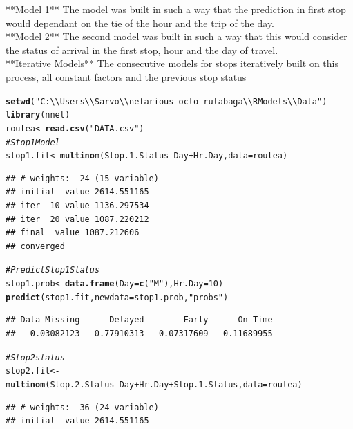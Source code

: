\documentclass[12pt]{article}\usepackage[]{graphicx}\usepackage[]{color}
\makeatletter
\newcommand{\hlnum}[1]{\textcolor[rgb]{0.686,0.059,0.569}{#1}}%
\newcommand{\hlstr}[1]{\textcolor[rgb]{0.192,0.494,0.8}{#1}}%
\newcommand{\hlcom}[1]{\textcolor[rgb]{0.678,0.584,0.686}{\textit{#1}}}%
\newcommand{\hlopt}[1]{\textcolor[rgb]{0,0,0}{#1}}%
\newcommand{\hlstd}[1]{\textcolor[rgb]{0.345,0.345,0.345}{#1}}%
\newcommand{\hlkwb}[1]{\textcolor[rgb]{0.69,0.353,0.396}{#1}}%
\newcommand{\hlkwc}[1]{\textcolor[rgb]{0.333,0.667,0.333}{#1}}%
\newcommand{\hlkwd}[1]{\textcolor[rgb]{0.737,0.353,0.396}{\textbf{#1}}}%
\newenvironment{kframe}{%
 \def\at@end@of@kframe{}%
 \ifinner\ifhmode%
  \def\at@end@of@kframe{\end{minipage}}%
  \begin{minipage}{\columnwidth}%
 \fi\fi%
 \def\FrameCommand##1{\hskip\@totalleftmargin \hskip-\fboxsep
 \colorbox{shadecolor}{##1}\hskip-\fboxsep
     \hskip-\linewidth \hskip-\@totalleftmargin \hskip\columnwidth}%
 \MakeFramed {\advance\hsize-\width
   \@totalleftmargin\z@ \linewidth\hsize
   \@setminipage}}%
 {\par\unskip\endMakeFramed%
 \at@end@of@kframe}
\newenvironment{knitrout}{}{} %
\makeatother
\begin{document}
**Model 1** The model was built in such a way that the prediction in first stop would dependant on the tie of the hour and the trip of the day.\\
**Model 2** The second model was built in such a way that this would consider the status of arrival in the first stop, hour and the day of travel.\\
**Iterative Models** The consecutive models for stops iteratively built on this process, all constant factors and the previous stop status
\begin{knitrout}
\color{fgcolor}\begin{kframe}
\begin{alltt}
\hlkwd{setwd}\hlstd{(}\hlstr{"C:\textbackslash{}\textbackslash{}Users\textbackslash{}\textbackslash{}Sarvo\textbackslash{}\textbackslash{}nefarious-octo-rutabaga\textbackslash{}\textbackslash{}R Models\textbackslash{}\textbackslash{}Data"}\hlstd{)}
\hlkwd{library}\hlstd{(nnet)}
\hlstd{routea}\hlkwb{<-}\hlkwd{read.csv}\hlstd{(}\hlstr{"DATA.csv"}\hlstd{)}
\hlcom{# Stop 1 Model}
\hlstd{stop1.fit}\hlkwb{<-}\hlkwd{multinom}\hlstd{(Stop.1.Status}\hlopt{~}\hlstd{Day}\hlopt{+}\hlstd{Hr.Day,}\hlkwc{data}\hlstd{=routea)}
\end{alltt}
\begin{verbatim}
## # weights:  24 (15 variable)
## initial  value 2614.551165 
## iter  10 value 1136.297534
## iter  20 value 1087.220212
## final  value 1087.212606 
## converged
\end{verbatim}
\begin{alltt}
\hlcom{# Predict Stop 1 Status}
\hlstd{stop1.prob}\hlkwb{<-}\hlkwd{data.frame}\hlstd{(}\hlkwc{Day}\hlstd{=}\hlkwd{c}\hlstd{(}\hlstr{"M"}\hlstd{),}\hlkwc{Hr.Day}\hlstd{=}\hlnum{10}\hlstd{)}
\hlkwd{predict}\hlstd{(stop1.fit,}\hlkwc{newdata} \hlstd{= stop1.prob,}\hlstr{"probs"}\hlstd{)}
\end{alltt}
\begin{verbatim}
## Data Missing      Delayed        Early      On Time 
##   0.03082123   0.77910313   0.07317609   0.11689955
\end{verbatim}
\begin{alltt}
\hlcom{#Stop 2 status}
\hlstd{stop2.fit}\hlkwb{<-}\hlkwd{multinom}\hlstd{(Stop.2.Status}\hlopt{~}\hlstd{Day}\hlopt{+}\hlstd{Hr.Day}\hlopt{+}\hlstd{Stop.1.Status,}\hlkwc{data}\hlstd{=routea)}
\end{alltt}
\begin{verbatim}
## # weights:  36 (24 variable)
## initial  value 2614.551165 

\end{verbatim}
\end{kframe}
\end{knitrout}
\end{document}
